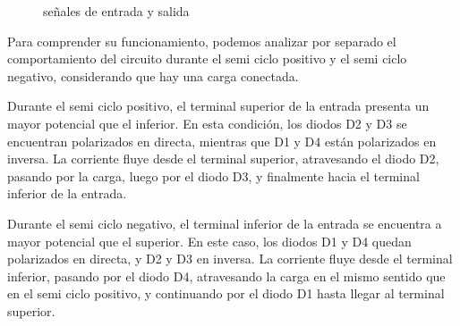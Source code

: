 \begin{figure}[h]
  \begin{minipage}[t][5cm][c]{0.5 \textwidth}
    \centering
  \end{minipage}
  \begin{minipage}[t][5cm][c]{0.5 \textwidth}
    \centering
  \end{minipage}
  \caption{señales de entrada y salida}
\end{figure}

Para comprender su funcionamiento, podemos analizar por separado el comportamiento del circuito durante el semi ciclo positivo y el
semi ciclo negativo, considerando que hay una carga conectada.

Durante el semi ciclo positivo, el terminal superior de la entrada presenta un mayor potencial que el inferior. En esta condición, los diodos
D2 y D3 se encuentran polarizados en directa, mientras que D1 y D4 están polarizados en inversa. La corriente fluye desde el terminal
superior, atravesando el diodo D2, pasando por la carga, luego por el diodo D3, y finalmente hacia el terminal inferior de la entrada.

Durante el semi ciclo negativo, el terminal inferior de la entrada se encuentra a mayor potencial que el superior. En este caso, los diodos
D1 y D4 quedan polarizados en directa, y D2 y D3 en inversa. La corriente fluye desde el terminal inferior, pasando por el diodo D4,
atravesando la carga en el mismo sentido que en el semi ciclo positivo, y continuando por el diodo D1 hasta llegar al terminal superior.

